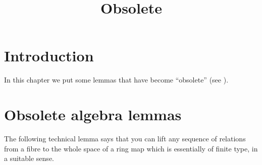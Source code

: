 

%


\title{Obsolete}

\maketitle

\label{section-phantom}

\tableofcontents




\section{Introduction}
\label{section-introduction}

\noindent
In this chapter we put some lemmas that have become ``obsolete''
(see \cite{Miller}).



\section{Obsolete algebra lemmas}
\label{section-algebra}


\noindent
The following technical lemma says that you can lift any sequence
of relations from a fibre to the whole space of a ring
map which is essentially of finite type, in a suitable sense.

